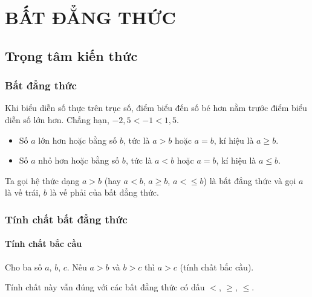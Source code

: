 \setcounter{section}{0}
\section{BẤT ĐẲNG THỨC}
\subsection{Trọng tâm kiến thức}
\begin{tomtat}
\subsubsection{Bất đẳng thức}
Khi biểu diễn số thực trên trục số, điểm biểu đến số bé hơn nằm trước điểm biểu diễn số lớn hơn. Chẳng hạn, $-2{,}5<-1<1{,}5$.
\begin{center}
\end{center}
\begin{itemize}
	\item Số $a$ lớn hơn hoặc bằng số $b$, tức là $a>b$ hoặc $a=b$, kí hiệu là $a\geq b$.
	\item Số $a$ nhỏ hơn hoặc bằng số $b$, tức là $a<b$ hoặc $a=b$, kí hiệu là $a\leq b$.
\end{itemize}
\begin{boxdn}
	Ta gọi hệ thức dạng $a>b$ (hay $a<b$, $a\geq b$, $a<\leq b$) là bất đẳng thức và gọi $a$ là vế trái, $b$ là vế phải của bất đẳng thức.
\end{boxdn}
\subsubsection{Tính chất bất đẳng thức}
\paragraph{Tính chất bắc cầu}
\begin{boxdn}
	\begin{tc}
	Cho ba số $a$, $b$, $c$. Nếu $a>b$ và $b>c$ thì $a>c$ (tính chất bắc cầu).
	\end{tc}
\end{boxdn}
\begin{note}
	Tính chất này vẫn đúng với các bất đẳng thức có dấu $<$, $\geq$, $\leq$.
\end{note}

\end{tomtat}
